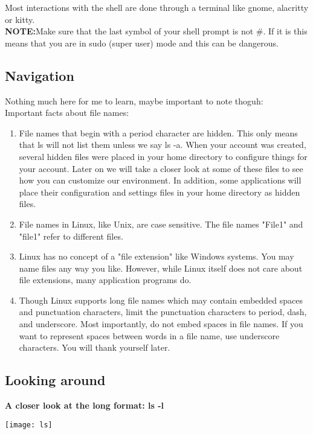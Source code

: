 \documentclass[12pt, letterpaper]{report}
\begin{document}
Most interactions with the shell are done through a terminal like gnome, alacritty
or kitty. \\

\textbf{NOTE:}Make sure that the last symbol of your shell prompt is not \#. If it is
this means that you are in sudo (super user) mode and this can be dangerous.

\subsection{Navigation}
Nothing much here for me to learn, maybe important to note thoguh:\\
Important facts about file names:
\begin{enumerate}
	\item File names that begin with a period character are hidden. This only means that ls will not list them unless we say ls -a. When your account was created, several hidden files were placed in your home directory to configure things for your account. Later on we will take a closer look at some of these files to see how you can customize our environment. In addition, some applications will place their configuration and settings files in your home directory as hidden files.

	\item File names in Linux, like Unix, are case sensitive. The file names "File1" and "file1" refer to different files.

	\item Linux has no concept of a "file extension" like Windows systems. You may name files any way you like. However, while Linux itself does not care about file extensions, many application programs do.

	\item Though Linux supports long file names which may contain embedded spaces and punctuation characters, limit the punctuation characters to period, dash, and underscore. Most importantly, do not embed spaces in file names. If you want to represent spaces between words in a file name, use underscore characters. You will thank yourself later.
\end{enumerate}

\subsection{Looking around}
\textbf{A closer look at the long format: ls -l}

\texttt{[image: ls]}
\end{document}
